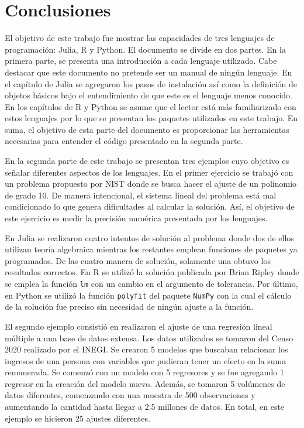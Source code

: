 \chapter{Conclusiones}

El objetivo de este trabajo fue mostrar las capacidades de tres lenguajes de programación: \textsf{Julia}, \textsf{R} y \textsf{Python}. El documento se divide en dos partes. En la primera parte, se presenta una introducción a cada lenguaje utilizado. Cabe destacar que este documento no pretende ser un manual de ningún lenguaje. En el capítulo de \textsf{Julia} se agregaron los pasos de instalación así como la definición de objetos básicos bajo el entendimiento de que este es el lenguaje menos conocido. En los capítulos de \textsf{R} y \textsf{Python} se asume que el lector está más familiarizado con estos lenguajes por lo que se presentan los paquetes utilizados en este trabajo.  En suma, el objetivo de esta parte del documento es proporcionar las herramientas necesarias para entender el código presentado en la segunda parte. 

En la segunda parte de este trabajo se presentan tres ejemplos cuyo objetivo es señalar diferentes aspectos de los lenguajes. En el primer ejercicio se trabajó con un problema propuesto por NIST donde se busca hacer el ajuste de un polinomio de grado 10. De manera intencional, el sistema lineal del problema está mal condicionado lo que genera dificultades al calcular la solución. Así, el objetivo de este ejercicio es medir la precisión numérica presentada por los lenguajes. 

En \textsf{Julia} se realizaron cuatro intentos de solución al problema donde dos de ellos utilizan teoría algebraica mientras los restantes emplean funciones de paquetes ya programados. De las cuatro manera de solución, solamente una obtuvo los resultados correctos. En \textsf{R} se utilizó la solución publicada por Brian Ripley donde se emplea la función \texttt{lm} con un cambio en el argumento de tolerancia. Por último, en \textsf{Python} se utilizó la función \texttt{polyfit} del paquete \texttt{NumPy} con la cual el cálculo de la solución fue preciso sin necesidad de ningún ajuste a la función. 

El segundo ejemplo consistió en realizaron el ajuste de una regresión lineal múltiple a una base de datos extensa. Los datos utilizados se tomaron del Censo 2020 realizado por el INEGI. Se crearon 5 modelos que buscaban relacionar los ingresos de una persona con variables que pudieran tener un efecto en la suma remunerada. Se comenzó con un modelo con 5 regresores y se fue agregando 1 regresor en la creación del modelo nuevo. Además, se tomaron 5 volúmenes de datos diferentes, comenzando con una muestra de 500 observaciones y aumentando la cantidad hasta llegar a 2.5 millones de datos. En total, en este ejemplo se hicieron 25 ajustes diferentes. 

